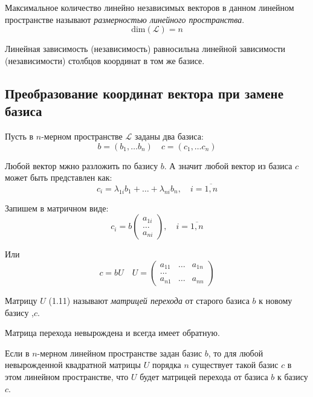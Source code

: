 \begin{definition}
    Максимальное количество линейно независимых векторов в данном линейном пространстве называют \textit{размерностью линейного пространства}. \[
        \mathrm{dim} (\mathcal{L}) = n
    \]
\end{definition}

Линейная зависимость (независимость) равносильна линейной зависимости (независимости) столбцов координат в том же базисе.

\subsection{Преобразование координат вектора при замене базиса}

Пусть в $n$-мерном пространстве $\mathcal{L}$ заданы два базиса:  \[
  b = \left( b_1, \ldots b_n \right) \quad c = \left( c_1, \ldots c_n \right) 
\] 

Любой вектор мжно разложить по базису $b$. А значит любой вектор из базиса  $c$ может быть представлен как:  \[
  c_i = \lambda_{1i} b_1 + \ldots + \lambda_{ni} b_n,
  \quad i = \overline{1, n}
\] 

Запишем в матричном виде: \[
  c_i = b
  \begin{pmatrix}
    a_{1i} \\ \ldots \\ a_{ni}
  \end{pmatrix},
  \quad i = \overline{1, n}
\] 

Или \[
  c = bU \quad U = 
  \begin{pmatrix}
    a_{11} & \ldots & a_{1n} \\
    \ldots \\
    a_{n1} & \ldots & a_{nn}
  \end{pmatrix}
  \tag{1.11}
\] 

\begin{definition}
  Матрицу $U$ (1.11) называют \textit{матрицей перехода} от старого базиса $b$ к новому базису ,$c$.
\end{definition}

\begin{property}[1]
  Матрица перехода невырождена и всегда имеет обратную.
\end{property}

\begin{property}[2]
    Если в $n$-мерном линейном пространстве задан базис $b$, то для любой невырожденной квадратной матрицы $U$ порядка $n$ существует такой базис $c$ в этом линейном пространстве, что $U$ будет матрицей перехода от базиса $b$ к базису $c$.
\end{property}

